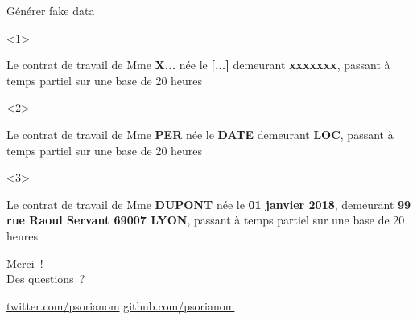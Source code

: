 \documentclass[10pt]{beamer}
\begin{document}
\begin{frame}{Générer fake data}
\begin{onlyenv}<1>
	\begin{citation}{}
		Le contrat de travail de Mme \textbf{X...} née le \textbf{[...]} demeurant \textbf{xxxxxxx}, passant à temps partiel
	sur une base de 20 heures 
	\end{citation}
\end{onlyenv}
\begin{onlyenv}<2>
	\begin{citation}{}
		Le contrat de travail de Mme \textbf{PER} née le \textbf{DATE} demeurant \textbf{LOC}, passant à temps partiel
		sur une base de 20 heures 
	\end{citation}
\end{onlyenv}

\begin{onlyenv}<3>
	\begin{citation}{}
		Le contrat de travail de Mme \textbf{DUPONT} née le \textbf{01 janvier 2018}, demeurant \textbf{99 rue Raoul Servant 69007 LYON}, passant à temps partiel
		sur une base de 20 heures 
	\end{citation}
\end{onlyenv}

\end{frame}
\begin{frame}[standout]

 Merci~! \\ 
 Des questions~?\\
 
 \vspace{1cm}
 
 \url{twitter.com/psorianom} 
 \url{github.com/psorianom} 
\end{frame}

\appendix
\end{document}
